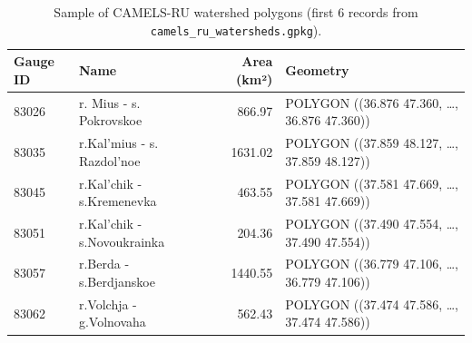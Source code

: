 \begin{table}[htbp]
\centering
\caption{Sample of CAMELS-RU watershed polygons (first 6 records from \texttt{camels\_ru\_watersheds.gpkg}).}
\label{tab:watersheds_sample}
\small
\begin{tabular}{llrp{6cm}}
\toprule
\textbf{Gauge ID} & \textbf{Name} & \textbf{Area (km²)} & \textbf{Geometry} \\
\midrule
83026 & r. Mius - s. Pokrovskoe & 866.97 & POLYGON ((36.876 47.360, \ldots, 36.876 47.360)) \\
83035 & r.Kal'mius - s. Razdol'noe & 1631.02 & POLYGON ((37.859 48.127, \ldots, 37.859 48.127)) \\
83045 & r.Kal'chik - s.Kremenevka & 463.55 & POLYGON ((37.581 47.669, \ldots, 37.581 47.669)) \\
83051 & r.Kal'chik - s.Novoukrainka & 204.36 & POLYGON ((37.490 47.554, \ldots, 37.490 47.554)) \\
83057 & r.Berda - s.Berdjanskoe & 1440.55 & POLYGON ((36.779 47.106, \ldots, 36.779 47.106)) \\
83062 & r.Volchja - g.Volnovaha & 562.43 & POLYGON ((37.474 47.586, \ldots, 37.474 47.586)) \\
\bottomrule
\end{tabular}
\end{table}
